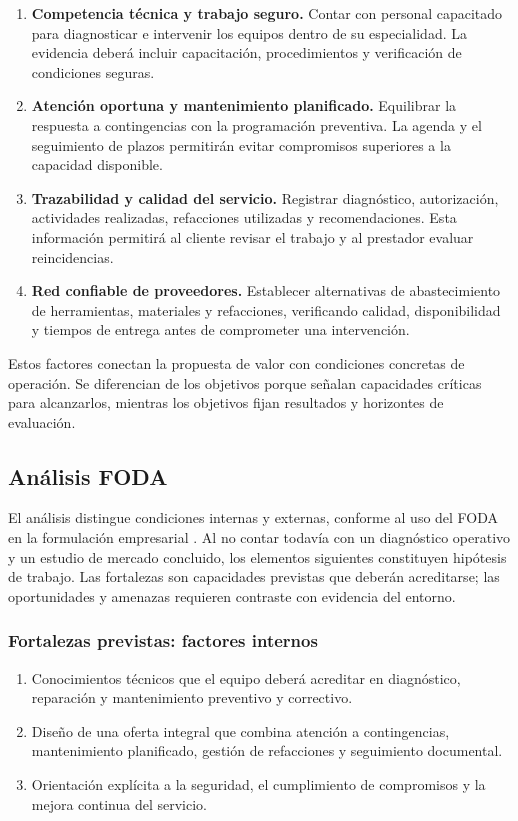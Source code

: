 {\begin{enumerate}
\item \textbf{Competencia técnica y trabajo seguro.} Contar con personal capacitado para diagnosticar e intervenir los equipos dentro de su especialidad. La evidencia deberá incluir capacitación, procedimientos y verificación de condiciones seguras.
\item \textbf{Atención oportuna y mantenimiento planificado.} Equilibrar la respuesta a contingencias con la programación preventiva. La agenda y el seguimiento de plazos permitirán evitar compromisos superiores a la capacidad disponible.
\item \textbf{Trazabilidad y calidad del servicio.} Registrar diagnóstico, autorización, actividades realizadas, refacciones utilizadas y recomendaciones. Esta información permitirá al cliente revisar el trabajo y al prestador evaluar reincidencias.
\item \textbf{Red confiable de proveedores.} Establecer alternativas de abastecimiento de herramientas, materiales y refacciones, verificando calidad, disponibilidad y tiempos de entrega antes de comprometer una intervención.
\end{enumerate}

Estos factores conectan la propuesta de valor con condiciones concretas de operación. Se diferencian de los objetivos porque señalan capacidades críticas para alcanzarlos, mientras los objetivos fijan resultados y horizontes de evaluación.

\subsection{Análisis FODA}

El análisis distingue condiciones internas y externas, conforme al uso del FODA en la formulación empresarial \citep{planNegociosGlosario2024}. Al no contar todavía con un diagnóstico operativo y un estudio de mercado concluido, los elementos siguientes constituyen hipótesis de trabajo. Las fortalezas son capacidades previstas que deberán acreditarse; las oportunidades y amenazas requieren contraste con evidencia del entorno.

\subsubsection{Fortalezas previstas: factores internos}
\begin{enumerate}
\item Conocimientos técnicos que el equipo deberá acreditar en diagnóstico, reparación y mantenimiento preventivo y correctivo.
\item Diseño de una oferta integral que combina atención a contingencias, mantenimiento planificado, gestión de refacciones y seguimiento documental.
\item Orientación explícita a la seguridad, el cumplimiento de compromisos y la mejora continua del servicio.
\end{enumerate}

}

